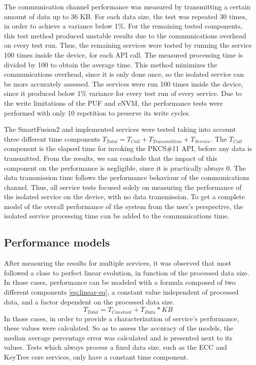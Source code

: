 The communication channel performance was measured by transmitting a certain amount of data up to 36 KB. For each data size, the test was repeated 30 times, in order to achieve a variance below 1\%.
For the remaining tested components, this test method produced unstable results due to the communications overhead on every test run.
Thus, the remaining services were tested by running the service 100 times inside the device, for each API call. The measured processing time is divided by 100 to obtain the average time. This method minimizes the communications overhead, since it is only done once, so the isolated service can be more accurately assessed.
The services were run 100 times inside the device, since it produced below 1\% variance for every test run of every service.
Due to the write limitations of the PUF and eNVM, the performance tests were performed with only 10 repetition to preserve its write cycles.

The SmartFusion2 and implemented services were tested taking into account three different time components \(T_{Total} = T_{Call} + T_{Transmittion} + T_{Service}\). The \(T_{Call}\) component is the elapsed time for invoking the PKCS\#11 API, before any data is transmitted. From the results, we can conclude that the impact of this component on the performance is negligible, since it is practically always 0.
The data transmission time follows the performance behaviour of the communications channel.
Thus, all service tests focused solely on measuring the performance of the isolated service on the device, with no data transmission. To get a complete model of the overall performance of the system from the user's perspective, the isolated service processing time can be added to the communications time.

\subsection{Performance models}\label{chap:evaluation:performance:models}

After measuring the results for multiple services, it was observed that most followed a close to perfect linear evolution, in function of the processed data size. In those cases, performance can be modeled with a formula composed of two different components \ref{eq:linear-eq}, a constant value independent of processed data, and a factor dependent on the processed data size.
\begin{equation}
	\label{eq:linear-eq}
	T_{Total} = T_{Constant} + T_{Data} * KB
\end{equation}
In those cases, in order to provide a characterization of service's performance, these values were calculated.
So as to assess the accuracy of the models, the median average percentage error was calculated and is presented next to its values. Tests which always process a fixed data size, such as the ECC and KeyTree core services, only have a constant time component.

